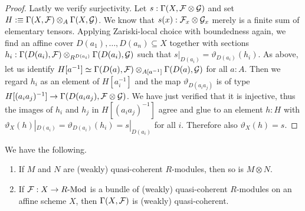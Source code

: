 \begin{proof}
  Lastly we verify surjectivity.
  Let $s:\Gamma(X,\mathcal{F} \otimes \mathcal{G})$ and set $H :\equiv \Gamma(X,\mathcal{F}) \otimes_A \Gamma(X,\mathcal{G})$.
  We know that $s(x) : \mathcal{F}_x \otimes \mathcal{G}_x$ merely is a finite sum of elementary tensors.
  Applying Zariski-local choice with boundedness again, we find an affine cover $D(a_1),\dots,D(a_n) \subseteq X$ together with sections $h_i : \Gamma(D(a_i), \mathcal{F}) \otimes_{R^{D(a_i)}} \Gamma(D(a_i),\mathcal{G})$ such that $s|_{D(a_i)} = \vartheta_{D(a_i)}(h_i)$.
  As above, let us identify $H[a^{-1}] \simeq \Gamma(D(a),\mathcal{F}) \otimes_{A[a^{-1}]} \Gamma(D(a), \mathcal{G})$ for all $a:A$.
  Then we regard $h_i$ as an element of $H[a_i^{-1}]$ and  the map $\vartheta_{D(a_ia_j)}$ is of type $H[(a_ia_j)^{-1}] \to \Gamma(D(a_ia_j),\mathcal{F} \otimes \mathcal{G})$.
  We have just verified that it is injective, thus the images of $h_i$ and $h_j$ in $H[(a_ia_j)^{-1}]$ agree and glue to an element $h : H$ with $\vartheta_X(h)|_{D(a_i)} = \vartheta_{D(a_i)}(h_i) = s|_{D(a_i)}$ for all $i$.
  Therefore also $\vartheta_X(h) = s$.
\end{proof}

\begin{corollary}
  We have the following.
  \begin{enumerate}
  \item[i)]
    \label{wqc-closed-under-tensorprod}
    If $M$ and $N$ are (weakly) quasi-coherent $R$-modules, then so is $M \otimes N$.

  \item[ii)]
    \label{wqc-closed-under-dep-prod}
    If $\mathcal{F} : X \to R\text{-}\mathrm{Mod}$ is a bundle of (weakly) quasi-coherent $R$-modules on an affine scheme $X$, then $\Gamma(X,\mathcal{F})$ is (weakly) quasi-coherent.
  \end{enumerate}
\end{corollary}

